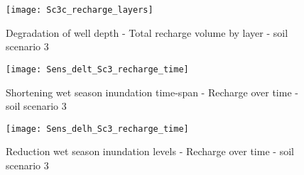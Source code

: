 \begin{figure}[h!]
 \centering
 \texttt{[image: Sc3c\_recharge\_layers]}
 \captionsetup{justification=centering} 
 \caption{Degradation of well depth - Total recharge volume by layer - soil scenario 3}
 \label{fig:Sc3c_recharge_layers}
\end{figure}


\begin{figure}[h!]
 \centering
 \texttt{[image: Sens\_delt\_Sc3\_recharge\_time]}
 \captionsetup{justification=centering} 
 \caption{Shortening wet season inundation time-span - Recharge over time - soil scenario 3}
 \label{fig:Sens_delt_Sc3_recharge_time}
\end{figure}

\begin{figure}[h!]
 \centering
 \texttt{[image: Sens\_delh\_Sc3\_recharge\_time]}
 \captionsetup{justification=centering} 
 \caption{Reduction wet season inundation levels - Recharge over time - soil scenario 3}
 \label{fig:Sens_delh_Sc3_recharge_time}
\end{figure}
